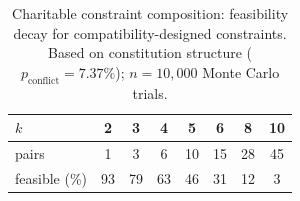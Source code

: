 \begin{table}[h]
\centering
\small
\caption{Charitable constraint composition: feasibility decay for compatibility-designed constraints. Based on constitution structure ($p_{\text{conflict}} = 7.37\%$); $n{=}10{,}000$ Monte Carlo trials.}
\label{tab:charity_k}
\begin{tabular}{l|ccccccc}
\toprule
$k$ & 2 & 3 & 4 & 5 & 6 & 8 & 10 \\
\midrule
pairs & 1 & 3 & 6 & 10 & 15 & 28 & 45 \\
feasible (\%) & 93 & 79 & 63 & 46 & 31 & 12 & 3 \\
\bottomrule
\end{tabular}
\end{table}